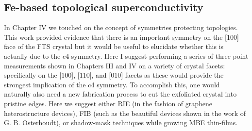 \subsection{Fe-based topological superconductivity}
In Chapter IV we touched on the concept of symmetries protecting topologies. This work provided evidence that there is an important symmetry on the [100] face of the \ac{FTS} crystal but it would be useful to elucidate whether this is actually due to the c4 symmetry. Here I suggest performing a series of three-point measurements shown in Chapters III and IV on a variety of crystal facets: specifically on the [100], [110], and [010] facets as these would provide the strongest implication of the c4 symmetry. To accomplish this, one would naturally also need a new fabrication process to cut the exfoliated crystal into pristine edges. Here we suggest either RIE (in the fashion of graphene heterostructure devices), FIB (such as the beautiful devices shown in the work of G. B. Osterhoudt\cite{Osterhoudt2019}), or shadow-mask techniques while growing MBE thin-films.